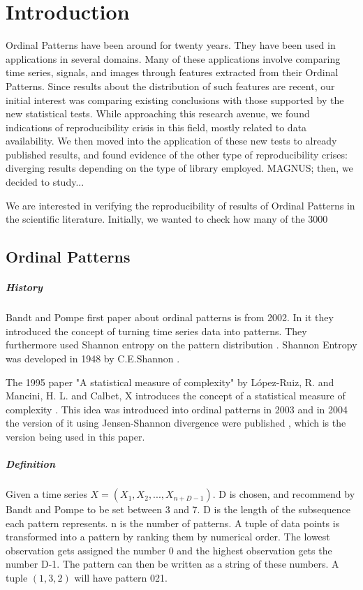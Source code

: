 
\chapter{Introduction}

Ordinal Patterns have been around for twenty years.
They have been used in applications in several domains.
Many of these applications involve comparing time series, signals, and images through features extracted from their Ordinal Patterns.
Since results about the distribution of such features are recent, our initial interest was comparing existing conclusions with those supported by the new statistical tests.
While approaching this research avenue, we found indications of reproducibility crisis in this field, mostly related to data availability.
We then moved into the application of these new tests to already published results, and found evidence of the other type of reproducibility crises: diverging results depending on the type of library employed.
MAGNUS; then, we decided to study...



We are interested in verifying the reproducibility of results of Ordinal Patterns in the scientific literature.
Initially, we wanted to check how many of the 3000

\section{Ordinal Patterns}
\paragraph{History}
Bandt and Pompe first paper about ordinal patterns is from 2002. In it they introduced the concept of turning time series data into patterns. They furthermore used Shannon entropy on the pattern distribution \cite{Bandt2002}. Shannon Entropy was developed in 1948 by C.E.Shannon \cite{Shannon1948}. 

The 1995 paper "A statistical measure of complexity" by López-Ruiz, R. and Mancini, H. L. and Calbet, X introduces the concept of a statistical measure of complexity 
 \cite{LopezRuiz1995}. This idea was introduced into ordinal patterns in 2003 \cite{Martin2003} and in 2004 the version of it using Jensen-Shannon divergence were published \cite{Lamberti2004}, which is the version being used in this paper.

\paragraph{Definition}
Given a time series $X=(X_1,X_2,...,X_{n+D-1})$. D is chosen, and recommend by Bandt and Pompe to be set between 3 and 7. D is the length of the subsequence each pattern represents. n is the number of patterns. A tuple of data points is transformed into a pattern by ranking them by numerical order. The lowest observation gets assigned the number 0 and the highest observation gets the number D-1. The pattern can then be written as a string of these numbers. A tuple $(1,3,2)$ will have pattern 021. 


